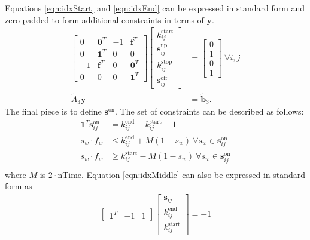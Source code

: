 Equations \ref{eqn:idxStart} and \ref{eqn:idxEnd} can be expressed in standard form and zero padded to form additional constraints in terms of $\mathbf{y}$.
\begin{equation} \begin{aligned}
	\begin{bmatrix} 0 & \mathbf{0}^T & -1 & \mathbf{f}^T \\
		        0 & \mathbf{1}^T &  0 & 0            \\
		       -1 & \mathbf{f}^T & 0 & \mathbf{0}^T  \\
		        0 & 0            & 0 & \mathbf{1}^T 
	\end{bmatrix} 
	\begin{bmatrix} k_{ij}^{\text{start}}       \\
		        \mathbf{s}_{ij}^{\text{up}} \\ 
			k_{ij}^{\text{stop}}        \\ 
			\mathbf{s}_{ij}^{\text{off}} 
	\end{bmatrix} &= 
	\begin{bmatrix} 0 \\ 
			1 \\
	                0 \\
			1
	\end{bmatrix} \ \forall i,j \\
	\tilde{A}_3\mathbf{y} &= \tilde{\mathbf{b}}_3.
\end{aligned} \end{equation}
The final piece is to define $\mathbf{s}^{\text{on}}$. The set of constraints can be described as follows: 
\begin{equation} \label{eqn:idxMiddle}\begin{aligned}
	\mathbf{1}^T\mathbf{s}^{\text{on}}_{ij} &= k^{\text{end}}_{ij} - k^{\text{start}}_{ij} - 1 \\
	s_w\cdot f_w &\le k^{\text{end}}_{ij} + M(1 - s_w) \ \forall s_w \in \mathbf{s}^{\text{on}}_{ij}\\
	s_w\cdot f_w &\ge k^{\text{start}}_{ij} - M(1 - s_w) \ \forall s_w \in \mathbf{s}^{\text{on}}_{ij}\\ 
\end{aligned} \end{equation}
where $M$ is $2\cdot\text{nTime}$.
Equation \ref{eqn:idxMiddle} can also be expressed in standard form as
\begin{equation} \begin{aligned}
	\begin{bmatrix}\mathbf{1}^T & - 1 & 1 \end{bmatrix} \begin{bmatrix}\mathbf{s}_{ij} \\ k_{ij}^{\text{end}} \\ k_{ij}^{\text{start}} \end{bmatrix} = -1
\end{aligned} \end{equation}

